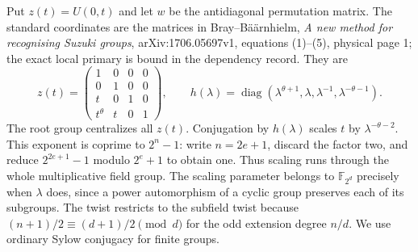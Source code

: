 \documentclass[11pt,a4paper]{article}
\begin{document}
Put $z(t)=U(0,t)$ and let $w$ be the antidiagonal permutation matrix.
The standard coordinates are the matrices in Bray--B\"a\"arnhielm,
\emph{A new method for recognising Suzuki groups}, arXiv:1706.05697v1,
equations (1)--(5), physical page 1; the exact local primary is bound in
the dependency record. They are
\[
z(t)=\begin{pmatrix}1&0&0&0\\0&1&0&0\\t&0&1&0\\t^\theta&t&0&1\end{pmatrix},
\qquad
h(\lambda)=\operatorname{diag}(\lambda^{\theta+1},\lambda,
\lambda^{-1},\lambda^{-\theta-1}).
\]
The root group centralizes all $z(t)$. Conjugation by $h(\lambda)$ scales
$t$ by $\lambda^{-\theta-2}$. This exponent is coprime to $2^n-1$:
write $n=2e+1$, discard the factor two, and reduce $2^{2e+1}-1$ modulo
$2^e+1$ to obtain one. Thus scaling runs through the whole multiplicative
field group. The scaling parameter belongs to $\mathbb F_{2^d}$ precisely
when $\lambda$ does, since a power automorphism of a cyclic group preserves
each of its subgroups. The twist restricts to the subfield twist because
$(n+1)/2\equiv(d+1)/2\pmod d$ for the odd extension degree $n/d$.
We use ordinary Sylow conjugacy for finite groups.
\end{document}
